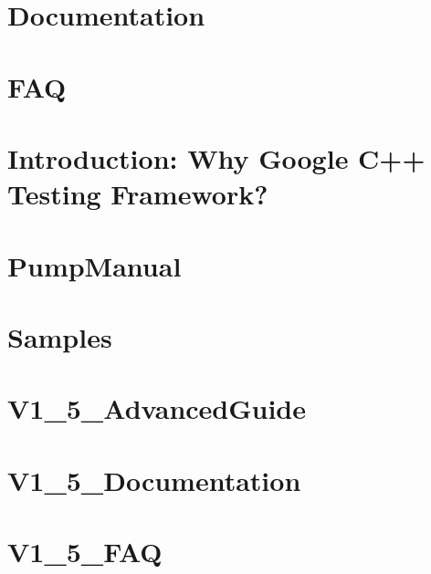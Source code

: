 \documentclass[twoside]{book}
\newcommand{\+}{\discretionary{\mbox{\scriptsize$\hookleftarrow$}}{}{}}
\begin{document}
\chapter{Documentation}
\label{md_vendor_googletest_googletest_docs_Documentation}
\hypertarget{md_vendor_googletest_googletest_docs_Documentation}{}

\chapter{F\+AQ}
\label{md_vendor_googletest_googletest_docs_FAQ}
\hypertarget{md_vendor_googletest_googletest_docs_FAQ}{}

\chapter{Introduction\+: Why Google C++ Testing Framework?}
\label{md_vendor_googletest_googletest_docs_Primer}
\hypertarget{md_vendor_googletest_googletest_docs_Primer}{}

\chapter{Pump\+Manual}
\label{md_vendor_googletest_googletest_docs_PumpManual}
\hypertarget{md_vendor_googletest_googletest_docs_PumpManual}{}

\chapter{Samples}
\label{md_vendor_googletest_googletest_docs_Samples}
\hypertarget{md_vendor_googletest_googletest_docs_Samples}{}

\chapter{V1\+\_\+5\+\_\+\+Advanced\+Guide}
\label{md_vendor_googletest_googletest_docs_V1_5_AdvancedGuide}
\hypertarget{md_vendor_googletest_googletest_docs_V1_5_AdvancedGuide}{}

\chapter{V1\+\_\+5\+\_\+\+Documentation}
\label{md_vendor_googletest_googletest_docs_V1_5_Documentation}
\hypertarget{md_vendor_googletest_googletest_docs_V1_5_Documentation}{}

\chapter{V1\+\_\+5\+\_\+\+F\+AQ}
\label{md_vendor_googletest_googletest_docs_V1_5_FAQ}
\hypertarget{md_vendor_googletest_googletest_docs_V1_5_FAQ}{}

\end{document}
